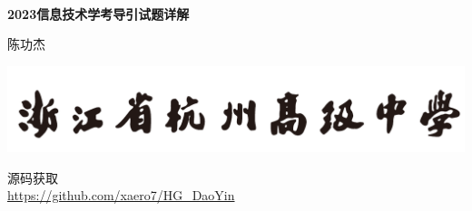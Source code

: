 \thispagestyle{empty}
\begin{titlepage}
\thispagestyle{empty}
    \begin{center}
    
    {\makeatletter\vspace*{5mm}
    \ifdefvoid{\@bookseries}{}{\bigskip\normalfont\fontsize{20}{20}\selectfont\@bookseries}
    \makeatother}

        \bigskip
        \bigskip

    {\makeatletter
    \fontsize{18}{20}\rmfamily\selectfont\@title \\\vspace*{5mm}
    \fontsize{32}{35}\rmfamily\bfseries\selectfont 2023信息技术学考导引试题详解
    \makeatother}
    
    \bigskip
    \bigskip
    
    \bigskip
    \bigskip
    \bigskip

    {\makeatletter
    \fontsize{16}{25}\rmfamily\selectfont 陈\hspace{5mm}功\hspace{5mm}杰
    \makeatother}
    
    \bigskip
    \bigskip

    
    \vfill
    
    
    \bigskip
    \bigskip
    
    {\makeatletter
    \vspace*{-5mm}
    \centering
    \includegraphics[width=0.4\linewidth]{figures/hglogoblack}    
    \makeatother}
    \end{center}
    
    \end{titlepage}
    \let\cleardoublepage\clearpage

    \thispagestyle{empty}
    \begin{center}
        {
        \vspace*{5cm}
        \fontsize{14}{20}\rmfamily\selectfont    源\hspace{1em}码\hspace{1em}获\hspace{1em}取}\\ 
        \bigskip
        \bigskip
        \href{https://github.com/xaero7/HG_DaoYin}{https://github.com/xaero7/HG\_DaoYin}


    \end{center}





